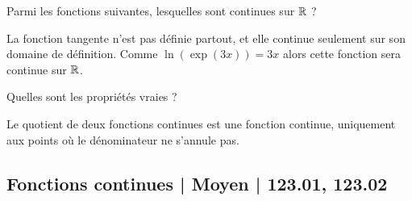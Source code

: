 \begin{question}
Parmi les fonctions suivantes, lesquelles sont continues sur $\mathbb{R}$ ?
\begin{answers}



\end{answers}
\begin{explanations}
La fonction tangente n'est pas définie partout, et elle continue seulement sur son domaine de définition. 
Comme $\ln(\exp(3x)) = 3x$ alors cette fonction sera continue sur $\mathbb{R}$.
\end{explanations}
\end{question}


\begin{question}
Quelles sont les propriétés vraies ?
\begin{answers}



\end{answers}
\begin{explanations}
Le quotient de deux fonctions continues est une fonction continue, uniquement aux points où le dénominateur ne s'annule pas.
\end{explanations}
\end{question}


\subsection{Fonctions continues | Moyen | 123.01, 123.02}


